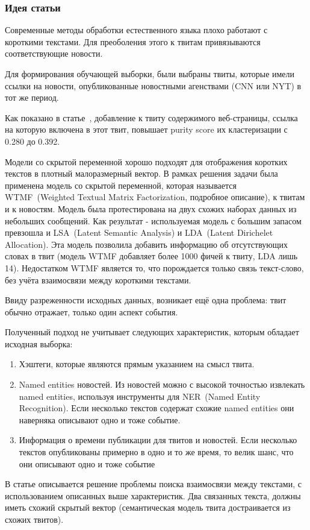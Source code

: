         \subsubsection{Идея статьи}
            Современные методы обработки естественного языка плохо работают с короткими текстами. Для преоболения этого к твитам привязываются соответствующие новости. 

            Для формирования обучающей выборки, были выбраны твиты, которые имели ссылки на новости, опубликованные новостными агенствами (CNN или NYT) в тот же период.
            
            Как показано в статье~\cite{long_to_short}, добавление к твиту содержимого веб-страницы, ссылка на которую включена в этот твит, повышает {\color{red} purity score} их кластеризации с 0.280 до 0.392.

            Модели со скрытой переменной хорошо подходят для отображения коротких текстов в плотный малоразмерный вектор.
            В рамках решения задачи была применена модель со скрытой переменной, которая называется WTMF~(Weighted Textual Matrix Factorization, подробное описание\cite{wtmf}), к твитам и к новостям. Модель была протестирована на двух схожих наборах данных из небольших сообщений. Как результат - используемая модель с большим запасом превзошла и LSA~(Latent Semantic Analysis) и LDA~(Latent Dirichelet Allocation). Эта модель позволила добавить информацию об отсутствующих словах в твит (модель WTMF добавляет более 1000 фичей к твиту, LDA лишь 14). Недостатком WTMF является то, что порождается только связь текст-слово, без учёта взаимосвязи между короткими текстами.
            
            Ввиду разреженности исходных данных, возникает ещё одна проблема: твит обычно отражает, только один аспект события.

            Полученный подход не учитывает следующих характеристик, которым обладает исходная выборка:
            \begin{enumerate}
                \item Хэштеги, которые являются прямым указанием на смысл твита.
                \item {\color{red} Named entities} новостей. Из новостей можно с высокой точностью извлекать {\color{red} named entities}, используя инструменты для NER~(Named Entity Recognition). Если несколько текстов содержат схожие {\color{red} named entities} они наверняка описывают одно и тоже событие.
                \item Информация о времени публикации для твитов и новостей. Если несколько текстов опубликованы примерно в одно и то же время, то велик шанс, что они описывают одно и тоже событие
            \end{enumerate}
            В статье описывается решение проблемы поиска взаимосвязи между текстами, с использованием описанных выше характеристик. Два связанных текста, должны иметь схожий скрытый вектор (семантическая модель твита достраивается из схожих твитов).


